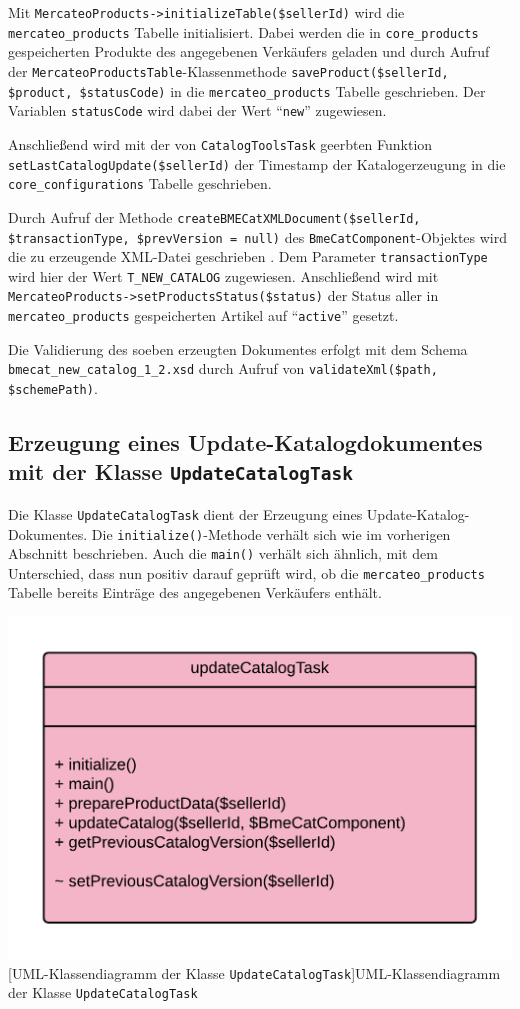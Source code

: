 {	
	Mit \texttt{MercateoProducts->initializeTable(\$sellerId)} wird die \texttt{mercateo\_products} Tabelle initialisiert. Dabei werden die in \texttt{core\_products} gespeicherten Produkte des angegebenen Verkäufers geladen und durch Aufruf der \texttt{MercateoProductsTable}-Klassenmethode  \texttt{saveProduct(\$sellerId, \$product, \$statusCode)} in die \texttt{mercateo\_products} Tabelle geschrieben. Der Variablen \texttt{statusCode} wird dabei der Wert \enquote{\texttt{new}} zugewiesen. 
	
	Anschließend wird mit der von \texttt{CatalogToolsTask} geerbten Funktion \texttt{setLastCatalogUpdate(\$sellerId)} der Timestamp der Katalogerzeugung in die \texttt{core\_configurations} Tabelle geschrieben.
		
	Durch Aufruf der Methode \texttt{createBMECatXMLDocument(\$sellerId, \$transactionType, \$prevVersion = null)} des \texttt{BmeCatComponent}-Objektes wird die zu erzeugende XML-Datei geschrieben . Dem Parameter \texttt{transactionType} wird hier der Wert \texttt{T\_NEW\_CATALOG} zugewiesen. Anschließend wird mit \texttt{MercateoProducts->setProductsStatus(\$status)}  der Status aller in \texttt{mercateo\_products} gespeicherten Artikel auf \enquote{\texttt{active}} gesetzt.

	Die Validierung des soeben erzeugten Dokumentes erfolgt mit dem Schema \texttt{bmecat\_new\_catalog\_1\_2.xsd} durch Aufruf von \texttt{validateXml(\$path, \$schemePath)}.
	
	
	
	\subsection{Erzeugung eines Update-Katalogdokumentes  mit der Klasse \texttt{UpdateCatalogTask}}
	
	Die Klasse \texttt{UpdateCatalogTask} dient der Erzeugung eines Update-Katalog-Dokumentes. Die \texttt{initialize()}-Methode verhält sich wie im vorherigen Abschnitt beschrieben. Auch die \texttt{main()} verhält sich ähnlich, mit dem Unterschied, dass nun positiv darauf geprüft wird, ob die \texttt{mercateo\_products} Tabelle bereits Einträge des angegebenen Verkäufers enthält. \\
	\begin{minipage}{\linewidth}
		\vspace{1em}
		\centering
		\includegraphics[width=0.6 \linewidth]{img/UpdateCatalogTaskUML}
		[UML-Klassendiagramm der Klasse \texttt{UpdateCatalogTask}]{UML-Klassendiagramm der Klasse \texttt{UpdateCatalogTask}}
		\vspace{1em}
	\end{minipage}
	
}
